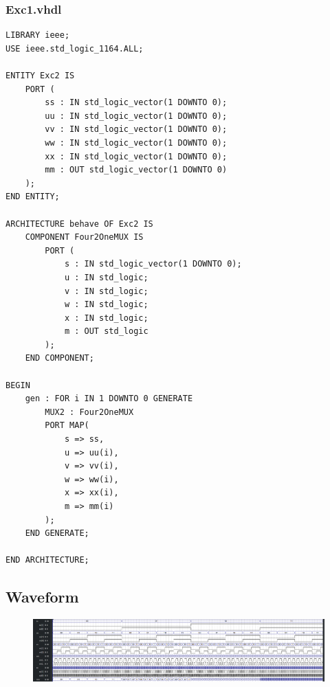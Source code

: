 \documentclass[13pt,a4paper]{report}
\begin{document}
\subsubsection{Exc1.vhdl}
\begin{verbatim}
LIBRARY ieee;
USE ieee.std_logic_1164.ALL;

ENTITY Exc2 IS
	PORT (
		ss : IN std_logic_vector(1 DOWNTO 0);
		uu : IN std_logic_vector(1 DOWNTO 0);
		vv : IN std_logic_vector(1 DOWNTO 0);
		ww : IN std_logic_vector(1 DOWNTO 0);
		xx : IN std_logic_vector(1 DOWNTO 0);
		mm : OUT std_logic_vector(1 DOWNTO 0)
	);
END ENTITY;

ARCHITECTURE behave OF Exc2 IS
	COMPONENT Four2OneMUX IS
		PORT (
			s : IN std_logic_vector(1 DOWNTO 0);
			u : IN std_logic;
			v : IN std_logic;
			w : IN std_logic;
			x : IN std_logic;
			m : OUT std_logic
		);
	END COMPONENT;

BEGIN
	gen : FOR i IN 1 DOWNTO 0 GENERATE
		MUX2 : Four2OneMUX
		PORT MAP(
			s => ss, 
			u => uu(i), 
			v => vv(i), 
			w => ww(i), 
			x => xx(i), 
			m => mm(i)
		);
	END GENERATE;

END ARCHITECTURE;
\end{verbatim}

\subsection{Waveform}
\begin{figure}[H]
\centering
\includegraphics[scale=1.05]{images/Exc2_waveform.png}
\end{figure}
\end{document}
